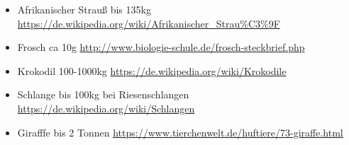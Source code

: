 \begin{itemize}
  \item Afrikanischer Strauß bis 135kg \url{https://de.wikipedia.org/wiki/Afrikanischer_Strau\%C3\%9F}
  \item Frosch ca 10g \url{http://www.biologie-schule.de/frosch-steckbrief.php}
  \item Krokodil 100-1000kg \url{https://de.wikipedia.org/wiki/Krokodile}
  \item Schlange bis 100kg bei Riesenschlangen \url{https://de.wikipedia.org/wiki/Schlangen}
  \item Girafffe bis 2 Tonnen \url{https://www.tierchenwelt.de/huftiere/73-giraffe.html}
 \end{itemize}

